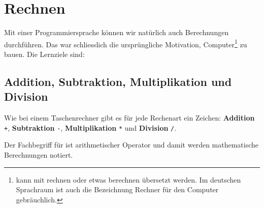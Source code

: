 
\toggletrue{image}
\toggletrue{imagehover}

\chapter{Rechnen}
\label{ch:rechnen}

Mit einer Programmiersprache können wir natürlich auch Berechnungen durchführen. Das war schliesslich die ursprüngliche Motivation, Computer\footnote{ kann mit rechnen oder etwas berechnen übersetzt werden. Im deutschen Sprachraum ist auch die Bezeichnung Rechner für den Computer gebräuchlich.} zu bauen. Die Lernziele sind:\\


\vspace{-0.6cm}

\section{Addition, Subtraktion, Multiplikation und Division}
\label{sec:addition-subtraktion-multiplikation-division-und-potenzierung}

Wie bei einem Taschenrechner gibt es für jede Rechenart ein Zeichen: \textbf{Addition} \lstinline[language={python3}]{+}, \textbf{Subtraktion} \lstinline[language={python3}]{-}, \textbf{Multiplikation} \lstinline[language={python3}]{*} und \textbf{Division} \lstinline[language={python3}]{/}.

\begin{definition}
Der Fachbegriff für  ist arithmetischer Operator und damit werden mathematische Berechnungen notiert.
\end{definition}

